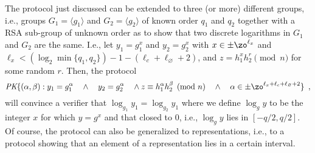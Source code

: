The protocol just discussed can be extended to three (or more) different groups, i.e., 
groups $G_1 = \langle g_1 \rangle$  and $G_2 = \langle g_2 \rangle$  of known order
$q_1$ and $q_2$ together with a RSA sub-group of unknown order as to show that two 
discrete logarithms in $G_1$ and $G_2$ are the same.
I.e., let $y_1 = g_1^x$ and $y_2 = g_2^x$ with $x \in \pm\zo^{\ell_x}$ and
 $\ell_x < (\log_2 \min\{q_1,q_2\}) - 1 - ( \ell_c 
+ \ell_\varnothing + 2) $, and $z = h_1^x h_2^r \pmod{n}$ for some random $r$.
Then, the protocol
\[
\textit{PK}\{(\alpha,\beta ): y_1 = g_1^\alpha  
\quad \wedge \quad 
y_2 = g_2^\alpha  
\quad \wedge \quad  \\
 z \equiv h_1^\alpha h_2^\beta \pmod{n}  \quad \wedge \quad 
\alpha \in  \pm\zo^{\ell_x+\ell_c + \ell_\varnothing+2}\}\enspace,
\]
will convince a verifier that $\log_{g_1} y_1 = \log_{g_2} y_1 $ 
where we define $\log_g y$ to be the integer $x$ for which $y=g^x$
and that closed to $0$, i.e.,  $\log_g y$ lies in $[-q/2,q/2]$.
Of course, the protocol can also be generalized to representations, i.e., to a protocol
showing that an element of a representation lies in a certain interval.

